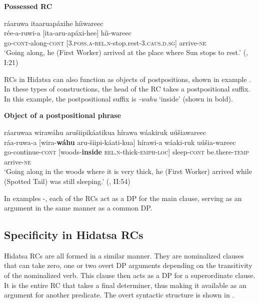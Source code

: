 \documentclass[output=paper]{LSP/langsci}
\begin{document}
\ea \textbf{Possessed RC} \label{boyle4}

\glll r\'aaruwa  {\ob}itaaruap\'axihe{\cb}   h\'iiwareec\\
r\'ee-a-ruwi-a  [ita-aru-ap\'axi-hee] h\'ii-wareec\\
go-\textsc{cont}-along-\textsc{cont} [\textsc{3.poss.a-rel.n}-stop.rest-\textsc{3.caus.d.sg}] arrive-\textsc{ne}\\
\trans `Going along, he (First Worker) arrived at the place where Sun stops to rest.' (\citealt{Lowie1939}, I:21)
\z

RCs in Hidatsa can also function as objects of postpositions, shown in example . In these types of constructions, the head of the RC takes a postpositional suffix. In this example, the postpositional suffix is \textit{-wahu} `inside' (shown in bold). 

\ea \textbf{Object of a postpositional phrase} \label{boyle5}

\glll r\'aaruwaa   {\ob}wiraw\'ahu  aru\v{s}iipik\'aatikua{\cb}   h\'irawa w\'aakiruk u\'u\v{s}iawareec\\
r\'aa-ruwa-a [wira-\textbf{w\'ahu} aru-\v{s}iipi-k\'aati-kua] h\'irawi-a w\'aaki-ruk u\'u\v{s}ia-wareec\\     
go-continue-\textsc{cont} [woods-\textbf{inside}  \textsc{rel.n}-thick-\textsc{emph-loc}] sleep-\textsc{cont} be.there-\textsc{temp} arrive-\textsc{ne}\\
\trans `Going along in the woods where it is very thick, he (First Worker) arrived while (Spotted Tail) was still sleeping.' (\citealt{Lowie1939}, II:54)
\z

In examples -, each of the RCs act as a DP for the main clause, serving as an argument in the same manner as a common DP.

\subsection{Specificity in Hidatsa RCs} 

Hidatsa RCs are all formed in a similar manner. They are nominalized clauses that can take zero, one or two overt DP arguments depending on the transitivity of the nominalized verb. This clause then acts as a DP for a superordinate clause. It is the entire RC that takes a final determiner, thus making it available as an argument for another predicate. The overt syntactic structure is shown in .
\end{document}
